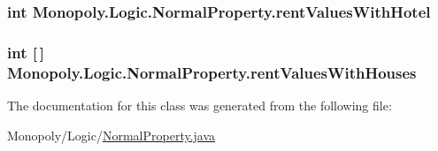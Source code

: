 \subsubsection[{\texorpdfstring{rent\+Values\+With\+Hotel}{rentValuesWithHotel}}]{\setlength{\rightskip}{0pt plus 5cm}int Monopoly.\+Logic.\+Normal\+Property.\+rent\+Values\+With\+Hotel\hspace{0.3cm}{\ttfamily [private]}}\hypertarget{class_monopoly_1_1_logic_1_1_normal_property_af1d8fcccf72faa5a718594967213ba55}{}\label{class_monopoly_1_1_logic_1_1_normal_property_af1d8fcccf72faa5a718594967213ba55}
\subsubsection[{\texorpdfstring{rent\+Values\+With\+Houses}{rentValuesWithHouses}}]{\setlength{\rightskip}{0pt plus 5cm}int \mbox{[}$\,$\mbox{]} Monopoly.\+Logic.\+Normal\+Property.\+rent\+Values\+With\+Houses\hspace{0.3cm}{\ttfamily [private]}}\hypertarget{class_monopoly_1_1_logic_1_1_normal_property_a918c6693fd0638db23698322ae3fdad3}{}\label{class_monopoly_1_1_logic_1_1_normal_property_a918c6693fd0638db23698322ae3fdad3}


The documentation for this class was generated from the following file\+:\begin{DoxyCompactItemize}
\item 
Monopoly/\+Logic/\hyperlink{_normal_property_8java}{Normal\+Property.\+java}\end{DoxyCompactItemize}
